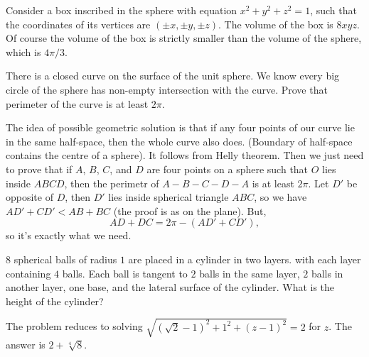 \documentclass[12pt,a4paper]{memoir}
\theoremstyle{definition}
\begin{document}
\begin{solution}[name={Solution by Arne}] 
	Consider a box inscribed in the sphere with equation $x^{2}+y^{2}+z^{2}= 1$, such that the coordinates of its vertices are $\left(\pm x, \pm y, \pm z\right)$. The volume of the box is $8xyz$. Of course the volume of the box is strictly smaller than the volume of the sphere, which is $4\pi/3$.
\end{solution}




\begin{question}[name={2002 Iran TST}]
	There is a closed curve on the surface of the unit sphere. We know every big circle of the sphere has non-empty intersection with the curve. Prove that perimeter of the curve is at least $2 \pi$.
\end{question}


\begin{solution}[name={Solution by Fedor Petrov}] 
	The idea of possible geometric solution is that if any four points of our curve lie in the same half-space, then the whole curve also does. (Boundary of half-space contains the centre of a sphere). It follows from Helly theorem. Then we just need to prove that if $A$, $B$, $C$, and $D$ are four points on a sphere such that $O$ lies inside $ABCD$, then the perimetr of $A-B-C-D-A$ is at least $ 2\pi$. Let $D'$ be opposite of $D$, then $ D'$ lies inside spherical triangle $ABC$, so we have $AD'+CD'<AB+BC$ (the proof is as on the plane). But, \[AD+DC=2\pi-(AD'+CD'),\] so it's exactly what we need.
\end{solution}




\begin{question}[name={2003 China}]
	$8$ spherical balls of radius $1$ are placed in a cylinder in two layers. with each layer containing $4$ balls. Each ball is tangent to $2$ balls in the same layer, $2$ balls in another layer, one base, and the lateral surface of the cylinder. What is the height of the cylinder?
\end{question}


\begin{solution}
	The problem reduces to solving $\sqrt{(\sqrt{2}-1)^2+1^2+(z-1)^2} = 2$ for $z$. The answer is $2+\sqrt[4]{8}$.
\end{solution}
\end{document}
